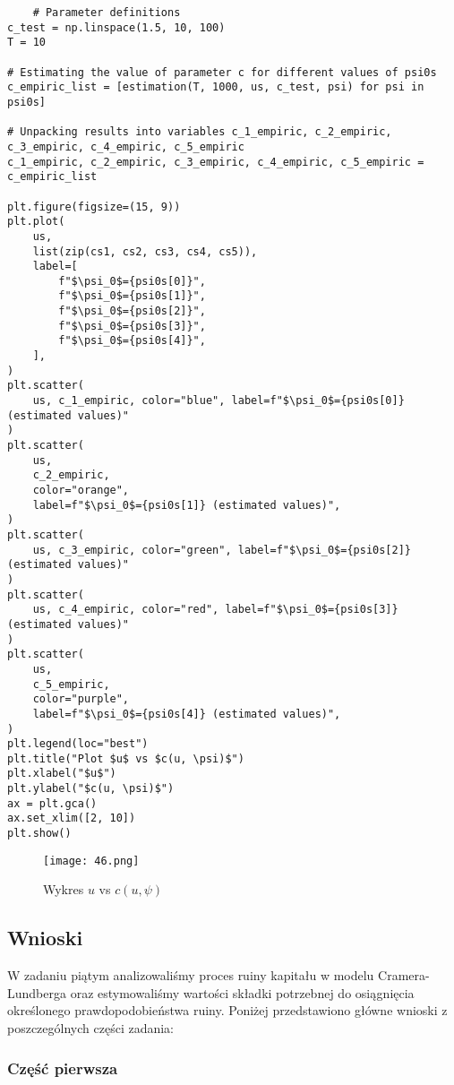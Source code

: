 \documentclass[12pt,letterpaper]{article}
\theoremstyle{definition}
\begin{document}
\begin{lstlisting}
    # Parameter definitions
c_test = np.linspace(1.5, 10, 100)
T = 10

# Estimating the value of parameter c for different values of psi0s
c_empiric_list = [estimation(T, 1000, us, c_test, psi) for psi in psi0s]

# Unpacking results into variables c_1_empiric, c_2_empiric, c_3_empiric, c_4_empiric, c_5_empiric
c_1_empiric, c_2_empiric, c_3_empiric, c_4_empiric, c_5_empiric = c_empiric_list

plt.figure(figsize=(15, 9))
plt.plot(
    us,
    list(zip(cs1, cs2, cs3, cs4, cs5)),
    label=[
        f"$\psi_0$={psi0s[0]}",
        f"$\psi_0$={psi0s[1]}",
        f"$\psi_0$={psi0s[2]}",
        f"$\psi_0$={psi0s[3]}",
        f"$\psi_0$={psi0s[4]}",
    ],
)
plt.scatter(
    us, c_1_empiric, color="blue", label=f"$\psi_0$={psi0s[0]} (estimated values)"
)
plt.scatter(
    us,
    c_2_empiric,
    color="orange",
    label=f"$\psi_0$={psi0s[1]} (estimated values)",
)
plt.scatter(
    us, c_3_empiric, color="green", label=f"$\psi_0$={psi0s[2]} (estimated values)"
)
plt.scatter(
    us, c_4_empiric, color="red", label=f"$\psi_0$={psi0s[3]} (estimated values)"
)
plt.scatter(
    us,
    c_5_empiric,
    color="purple",
    label=f"$\psi_0$={psi0s[4]} (estimated values)",
)
plt.legend(loc="best")
plt.title("Plot $u$ vs $c(u, \psi)$")
plt.xlabel("$u$")
plt.ylabel("$c(u, \psi)$")
ax = plt.gca()
ax.set_xlim([2, 10])
plt.show()

\end{lstlisting}
\begin{figure}[H]
    \centering
    \texttt{[image: 46.png]} 


    \caption{Wykres $u$ vs $c(u, \psi)$}

\end{figure}
\subsection{Wnioski}

W zadaniu piątym analizowaliśmy proces ruiny kapitału w modelu Cramera-Lundberga oraz estymowaliśmy wartości składki potrzebnej do osiągnięcia określonego prawdopodobieństwa ruiny. Poniżej przedstawiono główne wnioski z poszczególnych części zadania:

\subsubsection{Część pierwsza}
\end{document}
